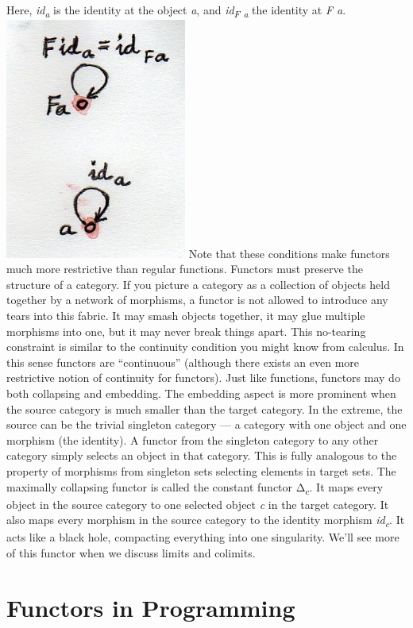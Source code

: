 Here, \emph{id\textsubscript{a}} is the identity at the object \emph{a},
and \emph{id\textsubscript{F a}} the identity at \emph{F a}.
\includegraphics[width=2.34375in]{images/functorid.jpg} Note that these
conditions make functors much more restrictive than regular functions.
Functors must preserve the structure of a category. If you picture a
category as a collection of objects held together by a network of
morphisms, a functor is not allowed to introduce any tears into this
fabric. It may smash objects together, it may glue multiple morphisms
into one, but it may never break things apart. This no-tearing
constraint is similar to the continuity condition you might know from
calculus. In this sense functors are ``continuous'' (although there
exists an even more restrictive notion of continuity for functors). Just
like functions, functors may do both collapsing and embedding. The
embedding aspect is more prominent when the source category is much
smaller than the target category. In the extreme, the source can be the
trivial singleton category --- a category with one object and one
morphism (the identity). A functor from the singleton category to any
other category simply selects an object in that category. This is fully
analogous to the property of morphisms from singleton sets selecting
elements in target sets. The maximally collapsing functor is called the
constant functor Δ\textsubscript{c}. It maps every object in the source
category to one selected object \emph{c} in the target category. It also
maps every morphism in the source category to the identity morphism
\emph{id\textsubscript{c}}. It acts like a black hole, compacting
everything into one singularity. We'll see more of this functor when we
discuss limits and colimits.

\section{Functors in Programming}\label{functors-in-programming}

